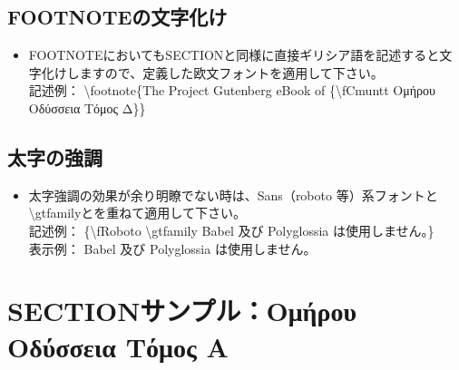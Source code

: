 \documentclass[a4paper,10pt]{ltjsarticle}
\def\colH#1{\color[HTML]{#1}}
\def\bs{\textbackslash }
\begin{document}
\subsection{FOOTNOTEの文字化け} \vspace{-1mm}  
\begin{itemize}
  \item FOOTNOTEにおいてもSECTIONと同様に直接ギリシア語を記述すると文字化けしますので、定義した欧文フォントを適用して下さい。\\
記述例： \bs footnote\{The Project Gutenberg eBook of {\colH{800000}\{\bs fCmuntt} \fCmuntt Ομήρου Οδύσσεια Τόμος Δ{\colH{800000}\}}\}
\end{itemize}

\subsection{太字の強調}  
\begin{itemize}
  \item 太字強調の効果が余り明瞭でない時は、Sans（roboto 等）系フォントと \bs gtfamilyとを重ねて適用して下さい。\\
記述例： \{{\colH{800000}\bs fRoboto \bs gtfamily} Babel 及び Polyglossia は使用しません。\}\\
表示例： {\fRoboto \gtfamily Babel 及び Polyglossia は使用しません。}
\end{itemize}

\section{SECTIONサンプル：{\fCmuntt Ομήρου Οδύσσεια Τόμος Α}}  
\end{document}
